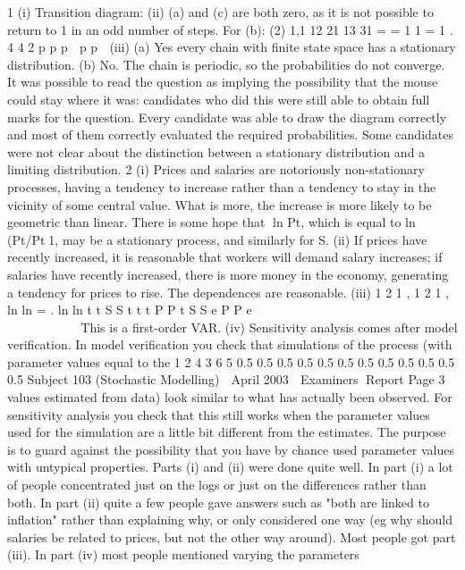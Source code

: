 1 (i) Transition diagram:
(ii) (a) and (c) are both zero, as it is not possible to return to 1 in an odd number of
steps.
For (b): (2)
1,1 12 21 13 31
= = 1 1 = 1 .
4 4 2
p p p  p p 
(iii) (a) Yes every chain with finite state space has a stationary distribution.
(b) No. The chain is periodic, so the probabilities do not converge.
It was possible to read the question as implying the possibility that the mouse could
stay where it was: candidates who did this were still able to obtain full marks for the
question.
Every candidate was able to draw the diagram correctly and most of them correctly
evaluated the required probabilities.
Some candidates were not clear about the distinction between a stationary
distribution and a limiting distribution.
2 (i) Prices and salaries are notoriously non-stationary processes, having a tendency
to increase rather than a tendency to stay in the vicinity of some central value.
What is more, the increase is more likely to be geometric than linear. There is
some hope that {ln Pt}, which is equal to {ln (Pt/Pt1}, may be a stationary
process, and similarly for S.
(ii) If prices have recently increased, it is reasonable that workers will demand
salary increases; if salaries have recently increased, there is more money in
the economy, generating a tendency for prices to rise. The dependences are
reasonable.
(iii) 1 2 1 ,
1 2 1 ,
ln ln
= .
ln ln
t t S S t
t t P P t
S S e
P P e


           
            
  
 	 	  
  
   
 
This is a first-order VAR.
(iv) Sensitivity analysis comes after model verification. In model verification you
check that simulations of the process (with parameter values equal to the
1 2 4
3 6 5
0.5 0.5
0.5 0.5
0.5
0.5 0.5 0.5
0.5 0.5
0.5 0.5
Subject 103 (Stochastic Modelling)  April 2003  Examiners Report
Page 3
values estimated from data) look similar to what has actually been observed.
For sensitivity analysis you check that this still works when the parameter
values used for the simulation are a little bit different from the estimates. The
purpose is to guard against the possibility that you have by chance used
parameter values with untypical properties.
Parts (i) and (ii) were done quite well. In part (i) a lot of people concentrated just on
the logs or just on the differences rather than both. In part (ii) quite a few people gave
answers such as "both are linked to inflation" rather than explaining why, or only
considered one way (eg why should salaries be related to prices, but not the other
way around).
Most people got part (iii). In part (iv) most people mentioned varying the parameters
